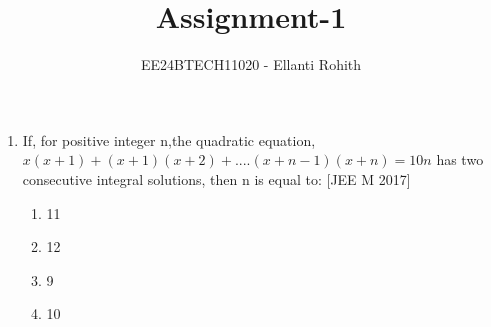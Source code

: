 \documentclass[journal,12pt,twocolumn]{IEEEtran}
\theoremstyle{remark}
\begin{document}

\vspace{3cm}

\title{Assignment-1}
\author{EE24BTECH11020 - Ellanti Rohith%
}
\maketitle
\newpage
\bigskip

\renewcommand{\thefigure}{\theenumi}
\renewcommand{\thetable}{\theenumi}
\begin{enumerate}
	\item {If, for positive integer n,the quadratic equation, $x(x+1)+(x+1)(x+2)+....(x+{n-1})(x+n)=10n$  has two consecutive integral solutions, then n is equal to:     \hfill{[JEE M 2017]} \begin{multicols}{2} 
\begin{enumerate}
    \item {11}
    \item{12}
    \columnbreak
    \item {9} 
    \item{10}\end{enumerate} 
    \end{multicols}}



\end{enumerate}
\end{document}
